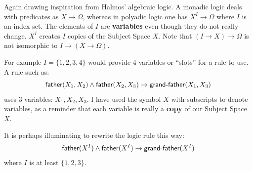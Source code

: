Again drawing inspiration from Halmos' algebraic logic.  A monadic logic deals with predicates as $X \rightarrow \Omega$, whereas in polyadic logic one has $X^I \rightarrow \Omega$ where $I$ is an index set.  The elements of $I$ are \textbf{variables} even though they do not really change.  $X^I$ creates $I$ copies of the Subject Space $X$. Note that $(I \rightarrow X) \rightarrow \Omega$ is not isomorphic to $I \rightarrow (X \rightarrow \Omega)$.


For example $I = \{ 1,2,3,4 \}$ would provide 4 variables or ``slots'' for a rule to use.  A rule such as:
\begin{equation}
	\mathsf{father}(X_1,X_2) \wedge \mathsf{father}(X_2,X_3) \rightarrow \mathsf{grand\hbox{-}father}(X_1,X_3)
\end{equation}
uses 3 variables: $X_1, X_2, X_3$.  I have used the symbol $X$ with subscripts to denote variables, as a reminder that each variable is really a \textbf{copy} of our Subject Space $X$.


It is perhaps illuminating to rewrite the logic rule this way:
\begin{equation}
	\mathsf{father}(X^I) \wedge \mathsf{father}(X^I) \rightarrow \mathsf{grand\hbox{-}father}(X^I)
\end{equation}
where $I$ is at least $\{ 1,2,3 \}$.

